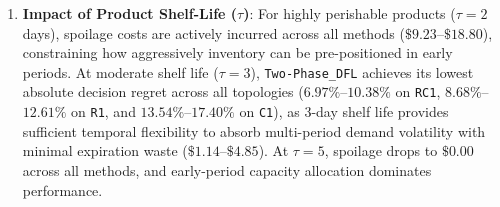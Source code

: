 \documentclass[11pt,a4paper]{article}
\theoremstyle{definition}
\theoremstyle{remark}
\begin{document}
\begin{enumerate}[label=(\roman*)]
    \item \textbf{Impact of Product Shelf-Life ($\tau$)}: For highly perishable products ($\tau = 2$ days), spoilage costs are actively incurred across all methods ($\$9.23$--$\$18.80$), constraining how aggressively inventory can be pre-positioned in early periods. At moderate shelf life ($\tau = 3$), \texttt{Two-Phase\_DFL} achieves its lowest absolute decision regret across all topologies ($6.97\%$--$10.38\%$ on \texttt{RC1}, $8.68\%$--$12.61\%$ on \texttt{R1}, and $13.54\%$--$17.40\%$ on \texttt{C1}), as 3-day shelf life provides sufficient temporal flexibility to absorb multi-period demand volatility with minimal expiration waste ($\$1.14$--$\$4.85$). At $\tau = 5$, spoilage drops to $\$0.00$ across all methods, and early-period capacity allocation dominates performance.
\end{enumerate}
\end{document}

